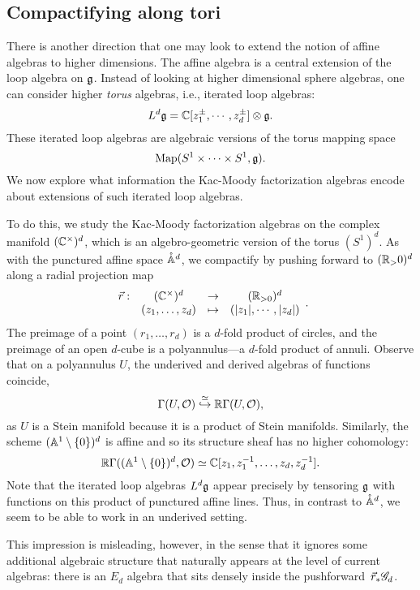 \subsection{Compactifying along tori} 

There is another direction that one may look to extend the notion of affine algebras to higher dimensions.
The affine algebra is a central extension of the loop algebra on $\fg$. 
Instead of looking at higher dimensional sphere algebras, one can consider higher {\em torus} algebras, i.e., iterated loop algebras:
\[
L^d \fg = \CC[z_1^{\pm}, \cdots, z_d^{\pm}] \tensor \fg .
\]
These iterated loop algebras are algebraic versions of the torus mapping space 
\[
{\rm Map}(S^1 \times \cdots \times S^1, \fg).
\] 
We now explore what information the Kac-Moody factorization algebras encode about extensions of such iterated loop algebras.

To do this, we study the Kac-Moody factorization algebras on the complex manifold $(\CC^\times)^d$, 
which is an algebro-geometric version of the torus $(S^1)^{d}$.  
As with the punctured affine space $\pAA^d$, we compactify by pushing forward to $(\RR_>0)^d$ along a radial projection map
\[
\begin{array}{cccc}
\vec{r} : & (\CC^\times)^d & \to & (\RR_{>0})^d\\
& (z_1,\ldots,z_d) & \mapsto & (|z_1|, \cdots, |z_d|)
\end{array}.
\]
The preimage of a point $(r_1,\ldots,r_d)$ is a $d$-fold product of circles, and
the preimage of an open $d$-cube is a polyannulus---a $d$-fold product of annuli.
Observe that on a polyannulus $U$, the underived and derived algebras of functions coincide,
\[
\Gamma(U, \cO) \overset{\simeq}{\hookrightarrow} \RR\Gamma(U,\cO),
\]
as $U$ is a Stein manifold because it is a product of Stein manifolds.
Similarly, the scheme $(\AA^1 \setminus \{0\})^d$ is affine and so its structure sheaf has no higher cohomology:
\[
\RR\Gamma((\AA^1 \setminus \{0\})^d,\cO) \simeq \CC[z_1, z_1^{-1}, \ldots, z_d,z_d^{-1}].
\]
Note that the iterated loop algebras $L^d \fg$ appear precisely by tensoring $\fg$ with functions on this product of punctured affine lines.
Thus, in contrast to $\pAA^d$, we seem to be able to work in an underived setting.

This impression is misleading, however, in the sense that it ignores some additional algebraic structure that naturally appears at the level of current algebras:
there is an $E_d$ algebra that sits densely inside the pushforward~$\vec{r}_* \sG_d$.

